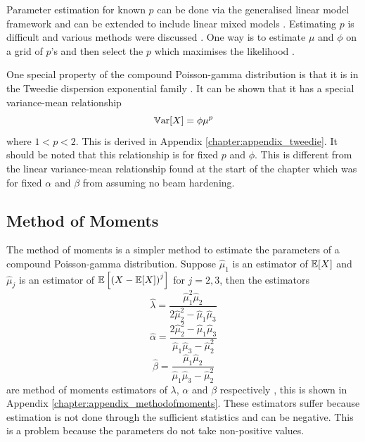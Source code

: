 Parameter estimation for known $p$ can be done via the generalised linear model framework and can be extended to include linear mixed models \citep{zhang2013likelihood}. Estimating $p$ is difficult and various methods were discussed \citep{zhang2013likelihood}. One way is to estimate $\mu$ and $\phi$ on a grid of $p$'s and then select the $p$ which maximises the likelihood \citep{dunn2005series}.

One special property of the compound Poisson-gamma distribution is that it is in the Tweedie dispersion exponential family \citep{jorgensen1987exponential}. It can be shown that it has a special variance-mean relationship
\begin{equation}
  \operatorname{\mathbb{V}ar}[X] = \phi \mu^p
\end{equation}
where $1<p<2$. This is derived in Appendix \ref{chapter:appendix_tweedie}. It should be noted that this relationship is for fixed $p$ and $\phi$. This is different from the linear variance-mean relationship found at the start of the chapter which was for fixed $\alpha$ and $\beta$ from assuming no beam hardening.

\subsection{Method of Moments}

The method of moments is a simpler method to estimate the parameters of a compound Poisson-gamma distribution. Suppose $\widehat{\mu}_1$ is an estimator of $\operatorname{\mathbb{E}}[X]$ and $\widehat{\mu}_j$ is an estimator of $\operatorname{\mathbb{E}}\left[\left(X-\operatorname{\mathbb{E}}[X]\right)^j\right]$ for $j=2,3$, then the estimators
\begin{equation}
  \widehat{\lambda}=\frac{\widehat{\mu}_1^2\widehat{\mu}_2}{2\widehat{\mu}_2^2-\widehat{\mu}_1\widehat{\mu}_3}
\end{equation}
\begin{equation}
  \widehat{\alpha}=\frac{2\widehat{\mu}_2^2-\widehat{\mu}_1\widehat{\mu}_3}{\widehat{\mu}_1\widehat{\mu}_3-\widehat{\mu}_2^2}
\end{equation}
\begin{equation}
  \widehat{\beta}=\frac{\widehat{\mu}_1\widehat{\mu}_2}{\widehat{\mu}_1\widehat{\mu}_3-\widehat{\mu}_2^2}
\end{equation}
are method of moments estimators of $\lambda$, $\alpha$ and $\beta$ respectively \citep{withers2011compound}, this is shown in Appendix \ref{chapter:appendix_methodofmoments}. These estimators suffer because estimation is not done through the sufficient statistics and can be negative. This is a problem because the parameters do not take non-positive values.

